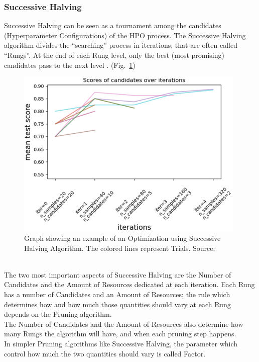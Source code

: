 \subsubsection{Successive Halving}

Successive Halving can be seen as a tournament among the candidates (Hyperparameter Configurations) of the HPO process.
The Successive Halving algorithm divides the “searching” process in iterations, that are often called “Rungs”. At the end of each Rung level, only the best (most promising) candidates pass to the next level \cite{Tesi-1.7} \cite{OptunaPruners-SuccessiveHalvingAlgorithm}. (Fig.~\ref{fig:figure-2.3.3})
\begin{figure}[t]
	\centering
	\includegraphics[width=11cm]{figures/figure-2.3.3.png}
	\caption[Successive Halving Algorithm Example]{Graph showing an example of an Optimization using Successive Halving Algorithm. The colored lines represent Trials. Source:~\cite{Tesi-1.7}}
	\label{fig:figure-2.3.3}
\end{figure}
% 
\\[0.3cm]The two most important aspects of Successive Halving are the Number of Candidates and the Amount of Resources dedicated at each iteration.
Each Rung has a number of Candidates and an Amount of Resources; the rule which determines how and how much those quantities should vary at each Rung depends on the Pruning algorithm.
\\[0.3cm]The Number of Candidates and the Amount of Resources also determine how many Rungs the algorithm will have, and when each pruning step happens.
% 
\\[0.3cm]In simpler Pruning algorithms like Successive Halving, the parameter which control how much the two quantities should vary is called Factor.

